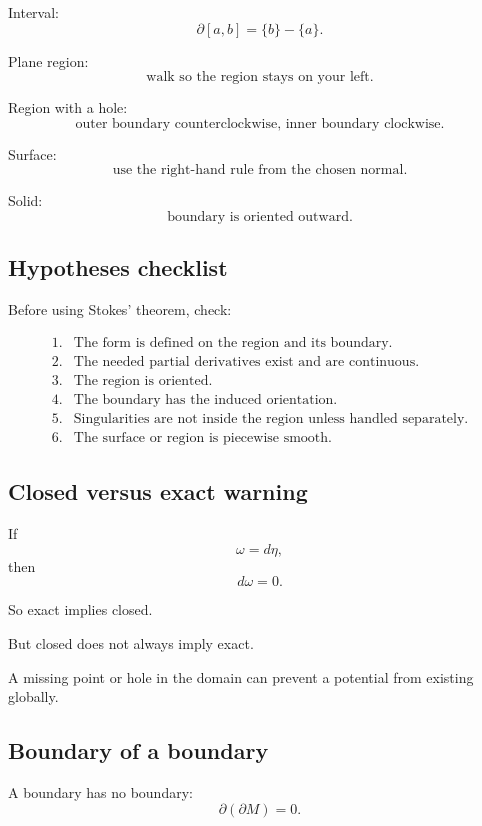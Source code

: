 Interval:
\[
\boxed{
    \partial[a,b]=\{b\}-\{a\}.
}
\]

Plane region:
\[
\boxed{
    \text{walk so the region stays on your left.}
}
\]

Region with a hole:
\[
\boxed{
    \text{outer boundary counterclockwise, inner boundary clockwise.}
}
\]

Surface:
\[
\boxed{
    \text{use the right-hand rule from the chosen normal.}
}
\]

Solid:
\[
\boxed{
    \text{boundary is oriented outward.}
}
\]

\subsection*{Hypotheses checklist}

Before using Stokes' theorem, check:

\[
\begin{array}{ll}
1. & \text{The form is defined on the region and its boundary.}\\[1mm]
2. & \text{The needed partial derivatives exist and are continuous.}\\[1mm]
3. & \text{The region is oriented.}\\[1mm]
4. & \text{The boundary has the induced orientation.}\\[1mm]
5. & \text{Singularities are not inside the region unless handled separately.}\\[1mm]
6. & \text{The surface or region is piecewise smooth.}
\end{array}
\]

\subsection*{Closed versus exact warning}

If
\[
    \omega=d\eta,
\]
then
\[
    d\omega=0.
\]

So exact implies closed.

But closed does not always imply exact.

A missing point or hole in the domain can prevent a potential from existing globally.

\subsection*{Boundary of a boundary}

A boundary has no boundary:
\[
\boxed{
    \partial(\partial M)=0.
}
\]

